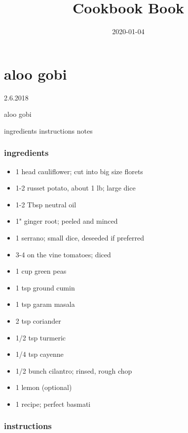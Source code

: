 \documentclass[]{book}
\title{Cookbook Book}
\author{}
\date{\vspace{-2.5em}2020-01-04}
\providecommand{\tightlist}{%
  \setlength{\itemsep}{0pt}\setlength{\parskip}{0pt}}
\begin{document}
\maketitle

{
\setcounter{tocdepth}{1}
\tableofcontents
}
\hypertarget{aloo-gobi}{%
\chapter{aloo gobi}\label{aloo-gobi}}

2.6.2018

aloo gobi

ingredients \textbar{}
instructions \textbar{}
notes

\hypertarget{ingredients}{%
\subsection{ingredients}\label{ingredients}}

\begin{itemize}
\tightlist
\item
  1 head cauliflower; cut into big size florets
\item
  1-2 russet potato, about 1 lb; large dice
\item
  1-2 Tbsp neutral oil
\item
  1" ginger root; peeled and minced
\item
  1 serrano; small dice, deseeded if preferred
\item
  3-4 on the vine tomatoes; diced
\item
  1 cup green peas
\item
  1 tsp ground cumin
\item
  1 tsp garam masala
\item
  2 tsp coriander
\item
  1/2 tsp turmeric
\item
  1/4 tsp cayenne
\item
  1/2 bunch cilantro; rinsed, rough chop
\item
  1 lemon (optional)
\item
  1 recipe; perfect basmati
\end{itemize}

\hypertarget{instructions}{%
\subsection{instructions}\label{instructions}}
\end{document}
